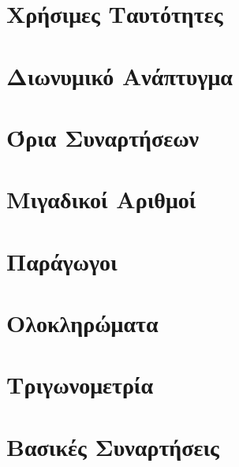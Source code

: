 


\usepackage{subfiles} 





\chapter{Χρήσιμες Ταυτότητες}


\vspace{\baselineskip}

\chapter{Διωνυμικό Ανάπτυγμα}


\vspace{\baselineskip}

\chapter{Όρια Συναρτήσεων}


\newpage

\chapter{Μιγαδικοί Αριθμοί}


\newpage

\chapter{Παράγωγοι}


\newpage

\chapter{Ολοκληρώματα}


\newpage

\chapter{Τριγωνομετρία}


\newpage

\chapter{Βασικές Συναρτήσεις}




